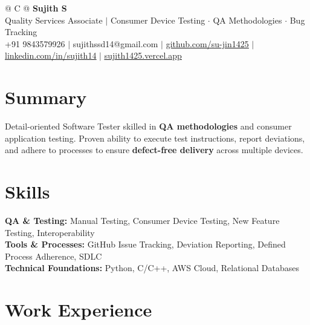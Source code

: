 \documentclass[a4paper,10pt]{article}
\newcommand{\ulink}[2]{\href{#1}{\uline{#2}}}
\begin{document}
\pagestyle{empty}

\begin{tabularx}{\linewidth}{@{} C @{}}
{\color[HTML]{000000}\fontsize{30}{35}\selectfont\bfseries Sujith S} \\[5pt]
{\fontsize{10.5}{12.5}\selectfont\color[HTML]{3A3A3A}
Quality Services Associate $|$ Consumer Device Testing $\cdot$ QA Methodologies $\cdot$ Bug Tracking} \\[6pt]
{\fontsize{9.5}{11.5}\selectfont\textcolor[HTML]{3A3A3A}{+91 9843579926 $|$ sujithssd14@gmail.com $|$ \ulink{https://github.com/su-jin1425}{github.com/su-jin1425} $|$ \ulink{https://linkedin.com/in/sujith14}{linkedin.com/in/sujith14} $|$ \ulink{https://sujith1425.vercel.app}{sujith1425.vercel.app}}}
\end{tabularx}

\vspace{2pt}

\section{Summary}
\vspace{1pt}
{\color[HTML]{0A0A0A}\fontsize{11}{14}\selectfont
Detail-oriented Software Tester skilled in \textbf{QA methodologies} and consumer application testing. Proven ability to execute test instructions, report deviations, and adhere to processes to ensure \textbf{defect-free delivery} across multiple devices.}

\vspace{1pt}

\section{Skills}
\vspace{1pt}
{\color[HTML]{0A0A0A}\fontsize{11}{14}\selectfont
\textbf{QA \& Testing:} Manual Testing, Consumer Device Testing, New Feature Testing, Interoperability \\[2pt]
\textbf{Tools \& Processes:} GitHub Issue Tracking, Deviation Reporting, Defined Process Adherence, SDLC \\[2pt]
\textbf{Technical Foundations:} Python, C/C++, AWS Cloud, Relational Databases}

\vspace{1pt}

\section{Work Experience}
\vspace{1pt}
\end{document}
